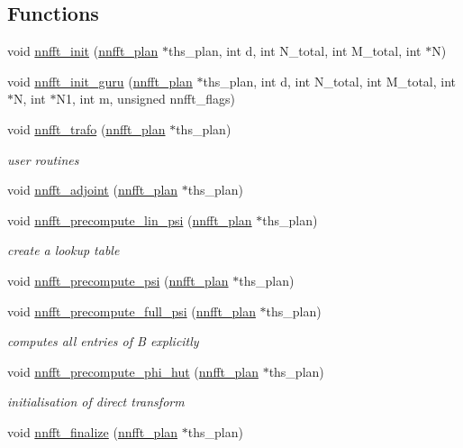 \subsection*{Functions}
\begin{DoxyCompactItemize}
\item 
void \hyperlink{group__nnfft_gad1f2d4b5b20fd14087364714f6475b19}{nnfft\-\_\-init} (\hyperlink{structnnfft__plan}{nnfft\-\_\-plan} $\ast$ths\-\_\-plan, int d, int N\-\_\-total, int M\-\_\-total, int $\ast$N)
\item 
void \hyperlink{group__nnfft_ga75a2cb786f4cc4c87082c87a2c32046a}{nnfft\-\_\-init\-\_\-guru} (\hyperlink{structnnfft__plan}{nnfft\-\_\-plan} $\ast$ths\-\_\-plan, int d, int N\-\_\-total, int M\-\_\-total, int $\ast$N, int $\ast$N1, int m, unsigned nnfft\-\_\-flags)
\item 
void \hyperlink{group__nnfft_ga994c1748ebe1371c53dd2cb437054d4f}{nnfft\-\_\-trafo} (\hyperlink{structnnfft__plan}{nnfft\-\_\-plan} $\ast$ths\-\_\-plan)
\begin{DoxyCompactList}\small\item\em user routines \end{DoxyCompactList}\item 
void \hyperlink{group__nnfft_gad4f536f3aee7e85acc75c5fcad307b7d}{nnfft\-\_\-adjoint} (\hyperlink{structnnfft__plan}{nnfft\-\_\-plan} $\ast$ths\-\_\-plan)
\item 
void \hyperlink{group__nnfft_ga65983eef73b9f5740214bf720f62fcd6}{nnfft\-\_\-precompute\-\_\-lin\-\_\-psi} (\hyperlink{structnnfft__plan}{nnfft\-\_\-plan} $\ast$ths\-\_\-plan)
\begin{DoxyCompactList}\small\item\em create a lookup table \end{DoxyCompactList}\item 
void \hyperlink{group__nnfft_ga962d6f449cbad4faf81e20328a911c46}{nnfft\-\_\-precompute\-\_\-psi} (\hyperlink{structnnfft__plan}{nnfft\-\_\-plan} $\ast$ths\-\_\-plan)
\item 
void \hyperlink{group__nnfft_ga78cf7bac65f6de46182ea1ff509c2af9}{nnfft\-\_\-precompute\-\_\-full\-\_\-psi} (\hyperlink{structnnfft__plan}{nnfft\-\_\-plan} $\ast$ths\-\_\-plan)
\begin{DoxyCompactList}\small\item\em computes all entries of B explicitly \end{DoxyCompactList}\item 
void \hyperlink{group__nnfft_ga9e4663c2cdbff65da327400657528580}{nnfft\-\_\-precompute\-\_\-phi\-\_\-hut} (\hyperlink{structnnfft__plan}{nnfft\-\_\-plan} $\ast$ths\-\_\-plan)
\begin{DoxyCompactList}\small\item\em initialisation of direct transform \end{DoxyCompactList}\item 
void \hyperlink{group__nnfft_ga9b5bcde6c436f8fe0e8d8dc4fa7a4230}{nnfft\-\_\-finalize} (\hyperlink{structnnfft__plan}{nnfft\-\_\-plan} $\ast$ths\-\_\-plan)
\end{DoxyCompactItemize}


